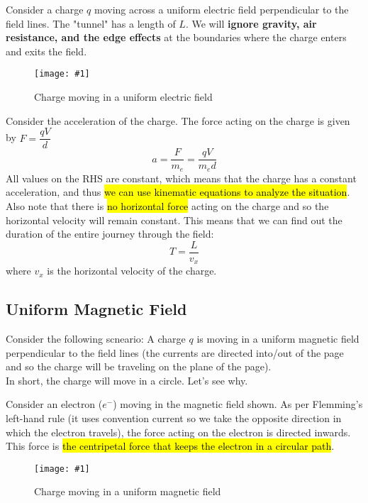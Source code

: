 \documentclass[a4paper,12pt]{article}
\newcommand{\lb}{\\[8pt]}
\newcommand{\img}[4]{\begin{center}
  \begin{figure}[H]
    \centering
    \texttt{[image: \#1]}
    \caption{#3}
    \label{fig:#4}
  \end{figure}
\end{center}}
\begin{document}
Consider a charge $q$ moving across a uniform electric field perpendicular to the field lines. The "tunnel" has a length of $L$. We will \textbf{ignore gravity, air resistance, and the edge effects} at the boundaries where the charge enters and exits the field.
\img{move1.png}{0.8}{Charge moving in a uniform electric field}{move1}

Consider the acceleration of the charge. The force acting on the charge is given by $F = \dfrac{qV}{d}$
$$a = \frac{F}{m_e} = \frac{qV}{m_ed}$$
All values on the RHS are constant, which means that the charge has a constant acceleration, and thus \hl{we can use kinematic equations to analyze the situation}.\lb
Also note that there is \hl{no horizontal force} acting on the charge and so the horizontal velocity will remain constant. This means that we can find out the duration of the entire journey through the field:
$$T = \frac{L}{v_x}$$
where $v_x$ is the horizontal velocity of the charge.


\subsection{Uniform Magnetic Field}\label{subsec:uniformmagneticfield}
Consider the following scneario: A charge $q$ is moving in a uniform magnetic field perpendicular to the field lines (the currents are directed into/out of the page and so the charge will be traveling on the plane of the page).\lb
In short, the charge will move in a circle. Let's see why.\lb

\begin{minipage}[t]
  {0.6\textwidth}
  Consider an electron ($e^-$) moving in the magnetic field shown. As per Flemming's left-hand rule (it uses convention current so we take the opposite direction in which the electron travels), the force acting on the electron is directed inwards. This force is \hl{the centripetal force that keeps the electron in a circular path}.
\end{minipage}\hspace*{0.05\textwidth}%
\begin{minipage}[t]
  {0.35\textwidth}
  \img{move2.png}{1}{Charge moving in a uniform magnetic field}{move2}
\end{minipage}
\end{document}
